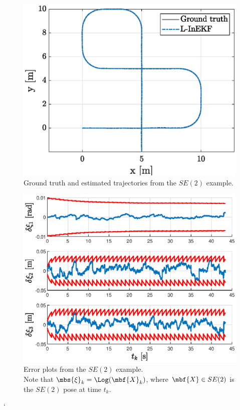 \documentclass[nobib]{tufte-handout}
\begin{document}
    \begin{figure}[h]
        \centering
        \includegraphics[width=\textwidth]{figs/se2_example_trajectories.eps}
        \caption{Ground truth and estimated trajectories from the $SE(2)$ example.}
        \label{fig:se2_example_trajectories}
    \end{figure}

    \begin{figure}[h]
        \centering
        \includegraphics[width=\textwidth]{figs/se2_example_error_plots.eps}
        \caption{Error plots from the $SE(2)$ example.\\ Note that $\mbs{\xi}_{k} = \Log(\mbf{X}_{k})$, where $\mbf{X}\in SE(2)$ is the $SE(2)$ pose at time $t_{k}$.}
        \label{fig:se2_example_error_plots}
    \end{figure}

    \clearpage`
    \begin{appendices}
        
    \end{appendices}

    \clearpage
    
    
\end{document}
